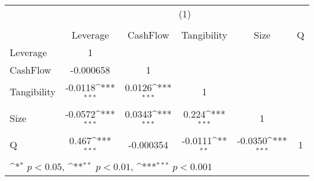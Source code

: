 {
\def\sym#1{\ifmmode^{#1}\else\(^{#1}\)\fi}
\begin{tabular}{l*{5}{c}}
\hline\hline
          &\multicolumn{5}{c}{(1)}                                                                       \\
          &\multicolumn{5}{c}{}                                                                          \\
          & Leverage         & CashFlow         &Tangibility         &     Size         &        Q         \\
\hline
Leverage  &        1         &                  &                  &                  &                  \\
CashFlow  &-0.000658         &        1         &                  &                  &                  \\
Tangibility&  -0.0118\sym{***}&   0.0126\sym{***}&        1         &                  &                  \\
Size      &  -0.0572\sym{***}&   0.0343\sym{***}&    0.224\sym{***}&        1         &                  \\
Q         &    0.467\sym{***}&-0.000354         &  -0.0111\sym{**} &  -0.0350\sym{***}&        1         \\
\hline\hline
\multicolumn{6}{l}{\footnotesize \sym{*} \(p<0.05\), \sym{**} \(p<0.01\), \sym{***} \(p<0.001\)}\\
\end{tabular}
}
